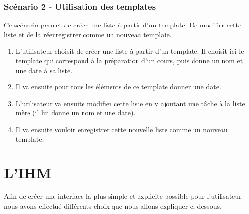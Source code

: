 \documentclass[a4paper,10pt]{article}
\begin{document}
\subsubsection{Scénario 2 - Utilisation des templates}
Ce scénario permet de créer une liste à partir d'un template. De modifier cette liste et de la réenregistrer comme un nouveau template.
\begin{enumerate}
\item{L'utilisateur choisit de créer une liste à partir d'un template. Il choisit ici le template qui correspond à la préparation d'un cours, puis donne un nom et une date à sa liste.}
\item{Il va ensuite pour tous les éléments de ce template donner une date.}
\item{L'utilisateur va ensuite modifier cette liste en y ajoutant une tâche à la liste mère (il lui donne un nom et une date).}
\item{Il va ensuite vouloir enregistrer cette nouvelle liste comme un nouveau template.}
\end{enumerate}


\newpage
\section{L'IHM}


Afin de créer une interface la plus simple et explicite possible pour l'utilisateur nous avons effectué différents choix que nous allons expliquer ci-dessous.
\end{document}
